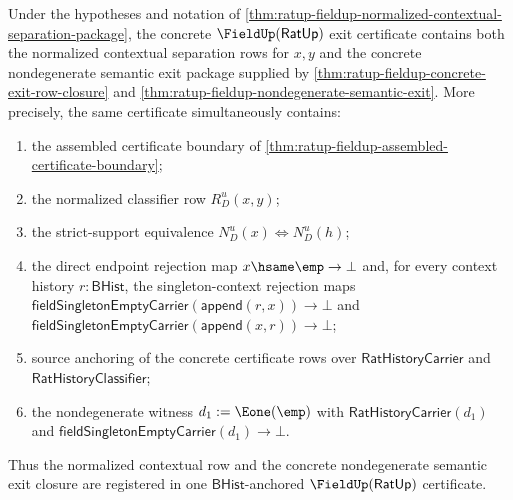 \begin{theorem}
\label{thm:ratup-fieldup-normalized-semantic-exit-certificate}
Under the hypotheses and notation of
\autoref{thm:ratup-fieldup-normalized-contextual-separation-package}, the
concrete $\FieldUp(\mathsf{RatUp})$ exit certificate contains both the
normalized contextual separation rows for $x,y$ and the concrete
nondegenerate semantic exit package supplied by
\autoref{thm:ratup-fieldup-concrete-exit-row-closure} and
\autoref{thm:ratup-fieldup-nondegenerate-semantic-exit}. More precisely, the
same certificate simultaneously contains:
\begin{enumerate}
  \item the assembled certificate boundary of
  \autoref{thm:ratup-fieldup-assembled-certificate-boundary};
  \item the normalized classifier row $R_D^u(x,y)$;
  \item the strict-support equivalence $N_D^u(x)\Longleftrightarrow N_D^u(h)$;
  \item the direct endpoint rejection map $x\hsame\emp\to\bot$ and, for every
  context history $r:\mathsf{BHist}$, the singleton-context rejection maps
  $\mathsf{fieldSingletonEmptyCarrier}(\mathsf{append}(r,x))\to\bot$ and
  $\mathsf{fieldSingletonEmptyCarrier}(\mathsf{append}(x,r))\to\bot$;
  \item source anchoring of the concrete certificate rows over
  $\mathsf{RatHistoryCarrier}$ and $\mathsf{RatHistoryClassifier}$;
  \item the nondegenerate witness $d_1:=\Eone(\emp)$ with
  $\mathsf{RatHistoryCarrier}(d_1)$ and
  $\mathsf{fieldSingletonEmptyCarrier}(d_1)\to\bot$.
\end{enumerate}
Thus the normalized contextual row and the concrete nondegenerate semantic exit
closure are registered in one $\mathsf{BHist}$-anchored
$\FieldUp(\mathsf{RatUp})$ certificate.
\end{theorem}
